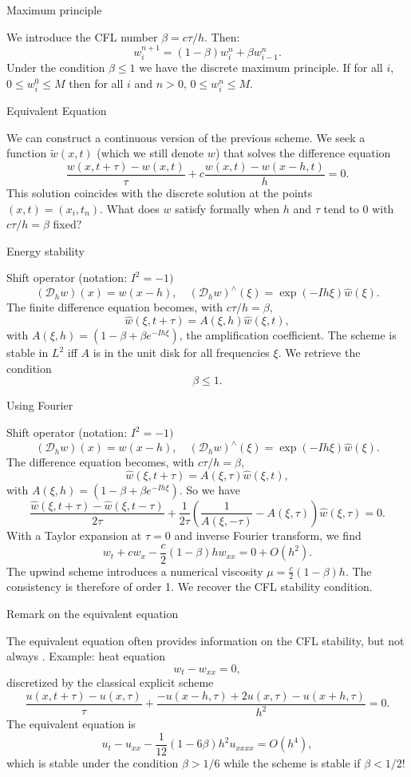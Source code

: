 \documentclass[english]{beamer}
\begin{document}
\begin{frame}{Maximum principle}

We introduce the CFL number $\beta=c\tau/h$. Then:
\[
w_{i}^{n+1}=(1-\beta)w_{i}^{n}+\beta w_{i-1}^{n}.
\]
Under the condition $\beta\leq1$ we have the discrete maximum principle.
If for all $i$, $0\leq w_{i}^{0}\leq M$ then for all $i$ and
$n>0$, $0\leq w_{i}^{n}\leq M$.
\end{frame}


\begin{frame}{Equivalent Equation}

  We can construct a continuous version of the previous scheme. We seek
  a function $\tilde{w}(x,t)$ (which we still denote $w$) that solves
  the difference equation
  \[
  \frac{w(x,t+\tau)-w(x,t)}{\tau}+c\frac{w(x,t)-w(x-h,t)}{h}=0.
  \]
  This solution coincides with the discrete solution at the points $(x,t)=(x_{i},t_{n})$.
  What does $w$ satisfy formally when $h$ and $\tau$ tend to 0
  with $c\tau/h=\beta$ fixed?
  \end{frame}
%
\begin{frame}{Energy stability}

Shift operator (notation: $I^{2}=-1)$
\[
(\mathcal{D}_{h}w)(x)=w(x-h),\quad(\mathcal{D}_{h}w)^{\wedge}(\xi)=\exp(-Ih\xi)\hat{w}(\xi).
\]
The finite difference equation becomes, with $c\tau/h=\beta,$
\[
\hat{w}(\xi,t+\tau)=A(\xi,h)\hat{w}(\xi,t),
\]
with $A(\xi,h)=(1-\beta+\beta e^{-Ih\xi})$, the amplification coefficient.
The scheme is stable in $L^{2}$ iff $A$ is in the unit disk
for all frequencies $\xi$. We retrieve the condition
\[
\beta\leq1.
\]

\end{frame}
%
\begin{frame}{Using Fourier}

Shift operator (notation: $I^{2}=-1)$
\[
(\mathcal{D}_{h}w)(x)=w(x-h),\quad(\mathcal{D}_{h}w)^{\wedge}(\xi)=\exp(-Ih\xi)\hat{w}(\xi).
\]
The difference equation becomes, with $c\tau/h=\beta,$
\[
\hat{w}(\xi,t+\tau)=A(\xi,\tau)\hat{w}(\xi,t),
\]
with $A(\xi,h)=(1-\beta+\beta e^{-Ih\xi})$. So we have
\[
\frac{\hat{w}(\xi,t+\tau)-\hat{w}(\xi,t-\tau)}{2\tau}+\frac{1}{2\tau}\left(\frac{1}{A(\xi,-\tau)}-A(\xi,\tau)\right)\hat{w}(\xi,\tau)=0.
\]
With a Taylor expansion at $\tau=0$ and inverse Fourier transform, we find
\[
w_{t}+cw_{x}-\frac{c}{2}(1-\beta)hw_{xx}=0+O(h^{2}).
\]
The upwind scheme introduces a numerical viscosity $\mu=\frac{c}{2}(1-\beta)h.$
The consistency is therefore of order 1. We recover the CFL stability condition.
\end{frame}
%
\begin{frame}{Remark on the equivalent equation}

The equivalent equation often provides information on the CFL stability, but not always \cite{dhaouadi2021stability}. Example: heat equation
\[
w_{t}-w_{xx}=0,
\]
discretized by the classical explicit scheme
\[
\frac{u(x,t+\tau)-u(x,\tau)}{\tau}+\frac{-u(x-h,\tau)+2u(x,\tau)-u(x+h,\tau)}{h^{2}}=0.
\]
The equivalent equation is
\[
u_{t}-u_{xx}-\frac{1}{12}(1-6\beta)h^{2}u_{xxxx}=O(h^{4}),
\]
which is stable under the condition $\beta>1/6$ while the scheme is stable if $\beta<1/2$!
\end{frame}
%
\end{document}
